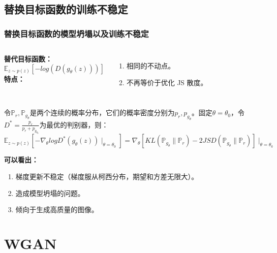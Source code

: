 \documentclass[xelatex]{beamer}
\begin{document}
\subsection{替换目标函数的训练不稳定}
\begin{frame}
\frametitle{替换目标函数的模型坍塌以及训练不稳定}
\begin{columns}[t]
\textbf{替代目标函数：} \\
$$
\mathbb{E}_{z \sim p(z)} \left [-log(D(g_\theta(z))) \right]
$$
  \textbf{特点：}
  \begin{enumerate}
    \item 相同的不动点。
    \item 不再等价于优化 JS 散度。
  \end{enumerate}
\end{columns}
\begin{theorem}
  令$\mathbb{P}_r,\mathbb{P}_{g_\theta}$是两个连续的概率分布，它们的概率密度分别为$p_r,p_{g_\theta}$。固定$\theta = \theta_0$，令$D^* = \frac{p_r}{p_r + p_{g_{\theta_0}}}$为最优的判别器，则：
  $$
  \mathbb{E}_{z \sim p(z)} \left [ -\nabla_\theta log D^*(g_\theta(z)) \mid_{\theta=\theta_0} \right ] = \nabla_\theta \left [ KL \left (\mathbb{P}_{g_\theta} \parallel \mathbb{P}_r \right) - 2JSD\left (\mathbb{P}_{g_\theta} \parallel \mathbb{P}_r  \right )\right ] \mid_{\theta=\theta_0}
  $$
\end{theorem}
\vspace{4mm}
\textbf{可以看出：} \\
\begin{enumerate}
  \item 梯度更新不稳定（梯度服从柯西分布，期望和方差无限大）。
  \item 造成模型坍塌的问题。
  \item 倾向于生成高质量的图像。
\end{enumerate}
\end{frame}

\section{WGAN}
\end{document}
